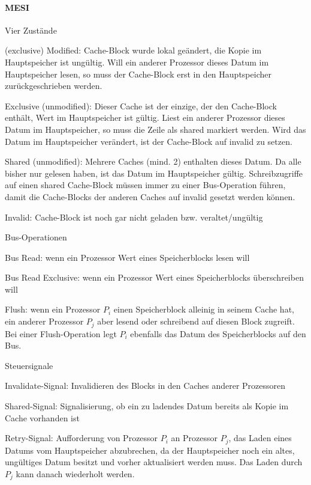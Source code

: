 \documentclass[10pt,landscape]{article}
\begin{document}
\begin{multicols}{3}
  \paragraph{MESI}
  Vier Zustände
  \begin{itemize*}
    \item (exclusive) Modified: Cache-Block wurde lokal geändert, die Kopie im Hauptspeicher ist ungültig. Will ein anderer Prozessor dieses Datum im Hauptspeicher lesen, so muss der Cache-Block erst in den Hauptspeicher zurückgeschrieben werden.
    \item Exclusive (unmodified): Dieser Cache ist der einzige, der den Cache-Block enthält, Wert im Hauptspeicher ist gültig. Liest ein anderer Prozessor dieses Datum im Hauptspeicher, so muss die Zeile als shared markiert werden. Wird das Datum im Hauptspeicher verändert, ist der Cache-Block auf invalid zu setzen.
    \item Shared (unmodified): Mehrere Caches (mind. 2) enthalten dieses Datum. Da alle bisher nur gelesen haben, ist das Datum im Hauptspeicher gültig. Schreibzugriffe auf einen shared Cache-Block müssen immer zu einer Bus-Operation führen, damit die Cache-Blocks der anderen Caches auf invalid gesetzt werden können.
    \item Invalid: Cache-Block ist noch gar nicht geladen bzw. veraltet/ungültig
  \end{itemize*}
  Bus-Operationen
  \begin{itemize*}
    \item Bus Read: wenn ein Prozessor Wert eines Speicherblocks lesen will
    \item Bus Read Exclusive: wenn ein Prozessor Wert eines Speicherblocks überschreiben will
    \item Flush: wenn ein Prozessor $P_i$ einen Speicherblock alleinig in seinem Cache hat, ein anderer Prozessor $P_j$ aber lesend oder schreibend auf diesen Block zugreift. Bei einer Flush-Operation legt $P_i$ ebenfalls das Datum des Speicherblocks auf den Bus.
  \end{itemize*}
  Steuersignale
  \begin{itemize*}
    \item Invalidate-Signal: Invalidieren des Blocks in den Caches anderer Prozessoren
    \item Shared-Signal: Signalisierung, ob ein zu ladendes Datum bereits als Kopie im Cache vorhanden ist
    \item Retry-Signal: Aufforderung von Prozessor $P_i$ an Prozessor $P_j$, das Laden eines Datums vom Hauptspeicher abzubrechen, da der Hauptspeicher noch ein altes, ungültiges Datum besitzt und vorher aktualisiert werden muss. Das Laden durch $P_j$ kann danach wiederholt werden.

\end{itemize*}
\end{multicols}
\end{document}
